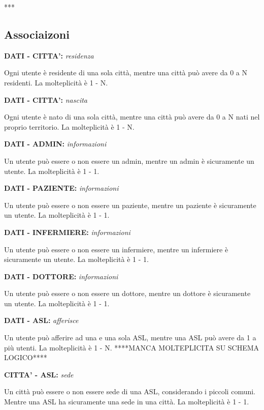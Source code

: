 \documentclass{report}
\begin{document}
***
\subsection*{Associaizoni}
\begin{center}
\textbf{DATI - CITTA':} \textit{residenza}
\end{center} 
Ogni utente è residente di una sola città, mentre una città può avere da 0 a N residenti. La molteplicità è 1 - N.


\begin{center}
\textbf{DATI - CITTA':} \textit{nascita}
\end{center} 

Ogni utente è nato di una sola città, mentre una città può avere da 0 a N nati nel proprio territorio. La molteplicità è 1 - N.


\begin{center}
\textbf{DATI - ADMIN:} \textit{informazioni}
\end{center} 
Un utente può essere o non essere un admin, mentre un admin è sicuramente un utente. La molteplicità è 1 - 1.


\begin{center}
\textbf{DATI - PAZIENTE:} \textit{informazioni}
\end{center} 
Un utente può essere o non essere un paziente, mentre un paziente è sicuramente un utente. La molteplicità è 1 - 1.


\begin{center}
\textbf{DATI - INFERMIERE:} \textit{informazioni}
\end{center} 
Un utente può essere o non essere un infermiere, mentre un infermiere è sicuramente un utente. La molteplicità è 1 - 1.


\begin{center}
\textbf{DATI - DOTTORE:} \textit{informazioni}
\end{center} 
Un utente può essere o non essere un dottore, mentre un dottore è sicuramente un utente. La molteplicità è 1 - 1.


\begin{center}
\textbf{DATI - ASL:} \textit{afferisce}
\end{center}
Un utente può afferire ad una e una sola ASL, mentre una ASL può avere da 1 a più utenti. La molteplicità è 1 - N. 
****MANCA MOLTEPLICITA SU SCHEMA LOGICO****

\begin{center}
\textbf{CITTA' - ASL:} \textit{sede}
\end{center} 
Un città può essere o non essere sede di una ASL, considerando i piccoli comuni. Mentre una ASL ha sicuramente una sede in una città. La molteplicità è 1 - 1.
\end{document}
